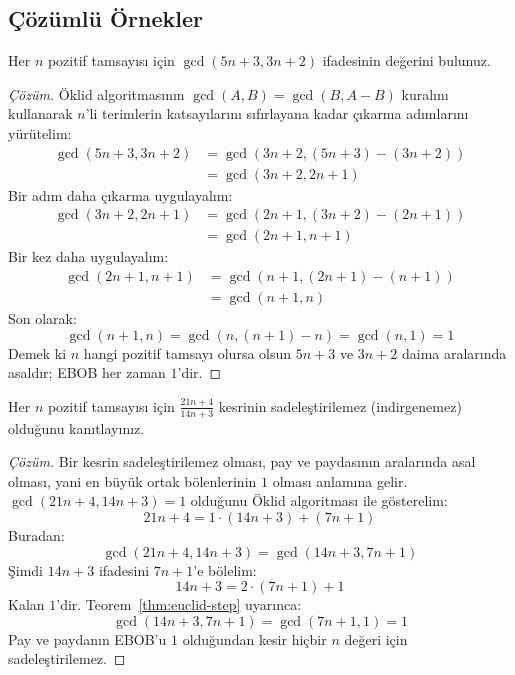 \subsection*{Çözümlü Örnekler}

\begin{example}
Her $n$ pozitif tamsayısı için $\gcd(5n + 3, 3n + 2)$ ifadesinin değerini bulunuz.
\end{example}

\begin{proof}[Çözüm]
Öklid algoritmasının $\gcd(A, B) = \gcd(B, A - B)$ kuralını kullanarak $n$'li terimlerin katsayılarını sıfırlayana kadar çıkarma adımlarını yürütelim:
\begin{align*}
    \gcd(5n + 3, 3n + 2) &= \gcd(3n + 2, (5n + 3) - (3n + 2)) \\
                         &= \gcd(3n + 2, 2n + 1)
\end{align*}
Bir adım daha çıkarma uygulayalım:
\begin{align*}
    \gcd(3n + 2, 2n + 1) &= \gcd(2n + 1, (3n + 2) - (2n + 1)) \\
                         &= \gcd(2n + 1, n + 1)
\end{align*}
Bir kez daha uygulayalım:
\begin{align*}
    \gcd(2n + 1, n + 1) &= \gcd(n + 1, (2n + 1) - (n + 1)) \\
                        &= \gcd(n + 1, n)
\end{align*}
Son olarak:
\[ \gcd(n + 1, n) = \gcd(n, (n + 1) - n) = \gcd(n, 1) = 1 \]
Demek ki $n$ hangi pozitif tamsayı olursa olsun $5n+3$ ve $3n+2$ daima aralarında asaldır; EBOB her zaman $1$'dir.
\end{proof}

\begin{example}
Her $n$ pozitif tamsayısı için $\frac{21n + 4}{14n + 3}$ kesrinin sadeleştirilemez (indirgenemez) olduğunu kanıtlayınız.
\end{example}

\begin{proof}[Çözüm]
Bir kesrin sadeleştirilemez olması, pay ve paydasının aralarında asal olması, yani en büyük ortak bölenlerinin $1$ olması anlamına gelir. $\gcd(21n + 4, 14n + 3) = 1$ olduğunu Öklid algoritması ile gösterelim:
\[ 21n + 4 = 1 \cdot (14n + 3) + (7n + 1) \]
Buradan:
\[ \gcd(21n + 4, 14n + 3) = \gcd(14n + 3, 7n + 1) \]
Şimdi $14n + 3$ ifadesini $7n + 1$'e bölelim:
\[ 14n + 3 = 2 \cdot (7n + 1) + 1 \]
Kalan $1$'dir. Teorem~\ref{thm:euclid-step} uyarınca:
\[ \gcd(14n + 3, 7n + 1) = \gcd(7n + 1, 1) = 1 \]
Pay ve paydanın EBOB'u $1$ olduğundan kesir hiçbir $n$ değeri için sadeleştirilemez.
\end{proof}

